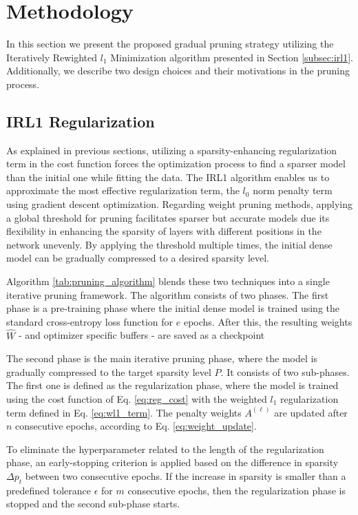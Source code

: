 \section{Methodology}\label{sec:method}

In this section we present the proposed gradual pruning strategy utilizing the Iteratively Rewighted $l_1$ Minimization algorithm presented in Section
\ref{subsec:irl1}. Additionally, we describe two design choices and their motivations in the pruning process.

\subsection{IRL1 Regularization}

As explained in previous sections, utilizing a sparsity-enhancing regularization term in the cost function forces the optimization process
to find a sparser model than the initial one while fitting the data. The IRL1 algorithm enables us to approximate the most effective regularization term,
the $l_0$ norm penalty term using gradient descent optimization. Regarding weight pruning methods, applying a global threshold for pruning
facilitates sparser but accurate models due its flexibility in enhancing the sparsity of layers with different positions in the network unevenly.  
By applying the threshold multiple times, the initial dense model can be gradually compressed to a desired sparsity level.

Algorithm \ref{tab:pruning_algorithm} blends these two techniques into a single iterative pruning framework. The algorithm consists of
two phases. The first phase is a pre-training phase where the initial dense model is trained using the standard cross-entropy loss function for
$e$ epochs. After this, the resulting weights $\hat{W}$ - and optimizer specific buffers -  are saved as a checkpoint

The second phase is the main iterative pruning phase, where the model is gradually compressed to the target sparsity level $P$. It consists of two
sub-phases. The first one is defined as the regularization phase, where the model is trained using the cost function of Eq. \ref{eq:reg_cost} with 
the weighted $l_1$ regularization term defined in Eq. \ref{eq:wl1_term}. The penalty weights $A^{(\ell)}$ are updated after $n$ consecutive
epochs, according to Eq. \ref{eq:weight_update}.

To eliminate the hyperparameter related to the length of the regularization phase, an early-stopping criterion is applied based on
the difference in sparsity $\Delta p_t$ between two consecutive epochs. 
If the increase in sparsity is smaller than a predefined tolerance $\epsilon$ for $m$ consecutive epochs, then 
the regularization phase is stopped and the second sub-phase starts.

